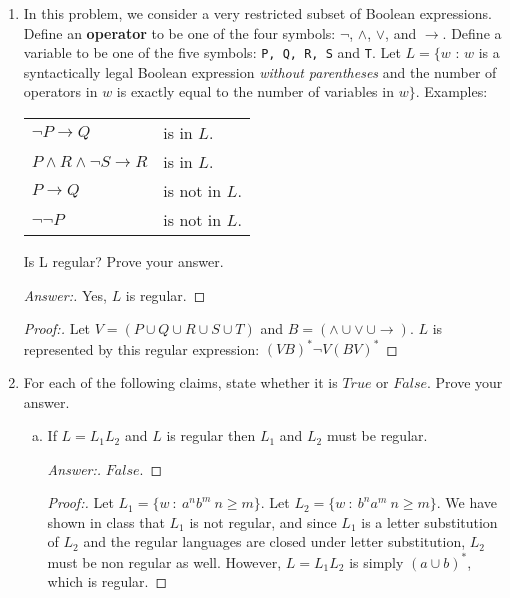 \documentclass[10pt]{article}
\begin{document}
\begin{enumerate}[1)]

\item
In this problem, we consider a very restricted subset of Boolean expressions.  Define an \textbf{operator} to be one of the four symbols: $\lnot$, $\land$, $\lor$, and $\rightarrow$.  Define a variable to be one of the five symbols: \texttt{P, Q, R, S} and \texttt{T}.  Let $L = \{w$ : $w$ is a syntactically legal Boolean expression \textit{without parentheses} and the number of operators in $w$ is exactly equal to the number of variables in $w\}$.  Examples:
\begin{center}
\begin{tabular}{l@{\hspace{1cm}}l}
$\lnot P \rightarrow Q$ &is in $L$.\\
$P \land R \land \lnot S \rightarrow R$ & is in $L$.\\
$P \rightarrow Q$ & is not in $L$.\\
$\lnot \lnot P$ & is not in $L$.
\end{tabular}
\end{center}

Is L regular?  Prove your answer.
\begin{proof}[Answer:]
Yes, $L$ is regular. 
\end{proof}
\begin{proof}[Proof:]
Let $V = (P \cup Q \cup R \cup S \cup T)$ and $B = (\land \cup \lor\ \cup \rightarrow)$. $L$ is represented by this regular expression: $(VB)^*\lnot V(BV)^*$
\end{proof} 


\item
For each of the following claims, state whether it is $True$ or $False$.  Prove your answer.
\begin{enumerate}[a)]
\item
If $L = L_1L_2$ and $L$ is regular then $L_1$ and $L_2$ must be regular.
\begin{proof}[Answer:]
$False$.
\end{proof}
\begin{proof}[Proof:]
Let $L_1 = \{w\ :\ a^nb^m\ n \geq m\}$.  Let $L_2 = \{w\ :\ b^na^m\ n \geq m\}$.  We have shown in class that $L_1$ is not regular, and since $L_1$ is a letter substitution of $L_2$ and the regular languages are closed under letter substitution, $L_2$ must be non regular as well.  However, $L = L_1L_2$ is simply $(a \cup b)^*$, which is regular.
\end{proof}


\end{enumerate}
\end{enumerate}
\end{document}
